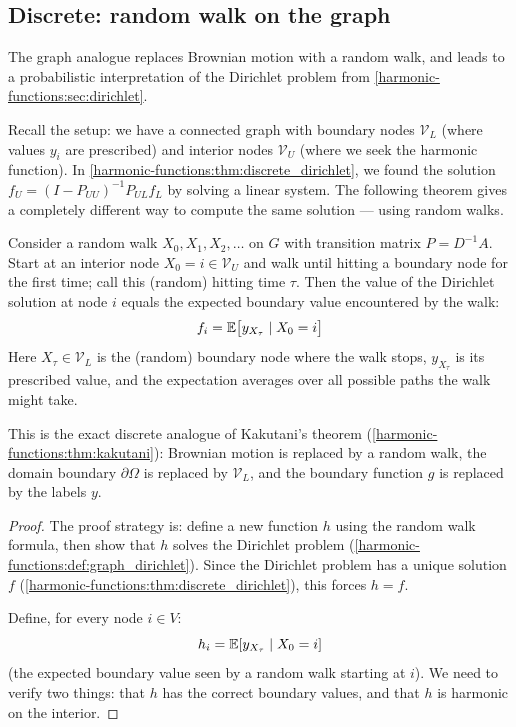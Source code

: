 \begin{notechapter}
\subsection{Discrete: random walk on the graph}

The graph analogue replaces Brownian motion with a random walk, and leads to
a probabilistic interpretation of the Dirichlet problem from
\cref{harmonic-functions:sec:dirichlet}.

Recall the setup: we have a connected graph with boundary nodes
$\mathcal{V}_L$ (where values $y_i$ are prescribed) and interior nodes
$\mathcal{V}_U$ (where we seek the harmonic function). In
\cref{harmonic-functions:thm:discrete_dirichlet}, we found the solution
$f_U = (I - P_{UU})^{-1}P_{UL}f_L$ by solving a linear system. The
following theorem gives a completely different way to compute the same
solution --- using random walks.

\begin{theorem}
\label{harmonic-functions:thm:rw_label_prop}
Consider a random walk $X_0, X_1, X_2, \ldots$ on $G$ with transition
matrix $P = D^{-1}A$. Start at an interior node $X_0 = i \in \mathcal{V}_U$
and walk until hitting a boundary node for the first time; call this
(random) hitting time $\tau$. Then the value of the Dirichlet solution at
node $i$ equals the expected boundary value encountered by the walk:
\begin{equation}
f_i = \mathbb{E}\bigl[y_{X_\tau} \mid X_0 = i\bigr]
\end{equation}
Here $X_\tau \in \mathcal{V}_L$ is the (random) boundary node where the
walk stops, $y_{X_\tau}$ is its prescribed value, and the expectation
averages over all possible paths the walk might take.
\end{theorem}

This is the exact discrete analogue of Kakutani's theorem
(\cref{harmonic-functions:thm:kakutani}): Brownian motion is replaced by a random walk,
the domain boundary $\partial\Omega$ is replaced by $\mathcal{V}_L$, and the
boundary function $g$ is replaced by the labels $y$.

\begin{proof}
The proof strategy is: define a new function $h$ using the random walk
formula, then show that $h$ solves the Dirichlet problem
(\cref{harmonic-functions:def:graph_dirichlet}). Since the Dirichlet problem has a
unique solution $f$ (\cref{harmonic-functions:thm:discrete_dirichlet}), this forces
$h = f$.

Define, for every node $i \in V$:
\[
h_i = \mathbb{E}[y_{X_\tau} \mid X_0 = i]
\]
(the expected boundary value seen by a random walk starting at $i$). We
need to verify two things: that $h$ has the correct boundary values, and
that $h$ is harmonic on the interior.


\end{proof}
\end{notechapter}
